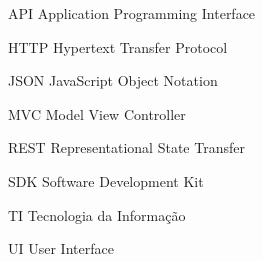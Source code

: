 
\begin{siglas}
 \item[API] Application Programming Interface
 \item[HTTP] Hypertext Transfer Protocol
 \item[JSON] JavaScript Object Notation
 \item[MVC] Model View Controller
 \item[REST] Representational State Transfer
 \item[SDK] Software Development Kit
 \item[TI] Tecnologia da Informação
 \item[UI] User Interface
\end{siglas}

